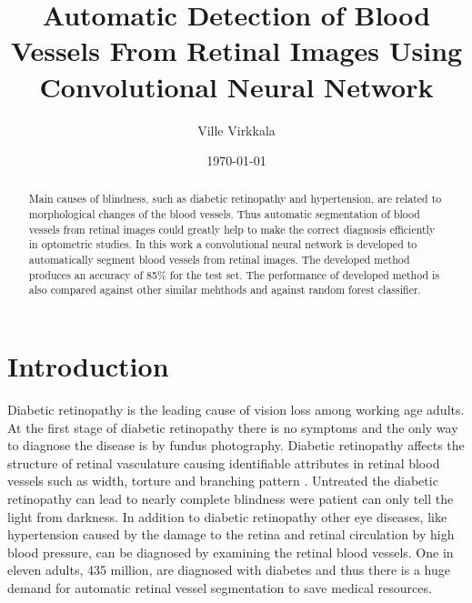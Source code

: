 \documentclass[aps,prb,10pt,twocolumn,groupedaddress]{revtex4-1}
\begin{document}
\title{Automatic Detection of Blood Vessels From Retinal Images Using Convolutional Neural Network }
\date{\today}
\author{Ville Virkkala}

\begin{abstract}
Main causes of blindness, such as diabetic retinopathy and hypertension, are related	to morphological changes of the blood vessels. Thus automatic segmentation of blood vessels from retinal images could greatly help to make the correct diagnosis efficiently in optometric studies. In this work a convolutional neural network is developed to automatically segment blood vessels from retinal images. The developed method produces an accuracy of 85\% for the test set. The performance of developed method is also compared against other similar mehthods and against random forest classifier. 
\end{abstract}

\maketitle

\section{Introduction}
Diabetic retinopathy is the leading cause of vision loss among working age adults. At the first stage of diabetic retinopathy there is no symptoms and the only way to diagnose the disease is by fundus photography. Diabetic retinopathy affects the structure of retinal vasculature causing identifiable attributes in retinal blood vessels such as width, torture and branching pattern \cite{zhu}. Untreated the diabetic retinopathy can lead to nearly complete blindness were patient can only tell the light from darkness. In addition to diabetic retinopathy other eye diseases, like hypertension caused by the damage to the retina and retinal circulation by high blood pressure, can be diagnosed by examining the retinal blood vessels. One in eleven adults, 435 million, are diagnosed with diabetes \cite{diabetic-federation} and thus there is a huge demand for automatic retinal vessel segmentation to save medical resources. 
\end{document}
